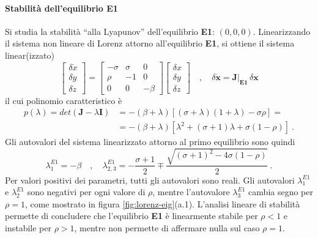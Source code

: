\paragraph{Stabilità dell'equilibrio E1}
Si studia la stabilità ``alla Lyapunov'' dell'equilibrio \textbf{E1}: $(0,0,0)$. Linearizzando
 il sistema non lineare di Lorenz attorno all'equilibrio \textbf{E1}, si ottiene il sistema
 linear(izzato)
\begin{equation}
 \begin{bmatrix} \delta \dot{x} \\ \delta \dot{y} \\ \delta \dot{z} \end{bmatrix} = 
 \begin{bmatrix}-\sigma & \sigma & 0 \\ \rho & -1 & 0 \\ 0 & 0 & - \beta \end{bmatrix}  
 \begin{bmatrix} \delta x \\ \delta y \\ \delta z \end{bmatrix} \quad , \quad
 \delta \dot{\bm{x}} = \bm{J}|_{\bm{E1}} \, \delta \bm{x}
\end{equation}
il cui polinomio caratteristico è
\begin{equation}
\begin{aligned}
 p(\lambda) = det(\bm{J}- \lambda \bm{I}) & = -(\beta+\lambda)[(\sigma+\lambda)(1+\lambda)-\sigma\rho] = \\ 
  & = -(\beta+\lambda) [ \lambda^2 + (\sigma+1)\lambda + \sigma(1-\rho)] \ . 
\end{aligned}
\end{equation}
Gli autovalori del sistema linearizzato attorno al primo equilibrio sono quindi
\begin{equation}
  \lambda^{E1}_1 = - \beta \quad , \quad  
  \lambda^{E1}_{2,3} = - \dfrac{\sigma+1}{2} \mp \dfrac{\sqrt{(\sigma+1)^2-4\sigma(1-\rho)}}{2} \ . 
\end{equation}
Per valori positivi dei parametri, tutti gli autovalori sono reali. Gli autovalori $\lambda^{E1}_1$
 e $\lambda^{E1}_2$ sono negativi per ogni valore di $\rho$, mentre l'autovalore $\lambda^{E1}_3$
 cambia segno per $\rho = 1$, come mostrato in figura \ref{fig:lorenz-eig}(a.1). L'analisi lineare di stabilità permette di concludere che l'equilibrio
 \textbf{E1} è linearmente stabile per $\rho<1$ e instabile per $\rho > 1$, mentre non
 permette di affermare nulla sul caso $\rho = 1$.
%
